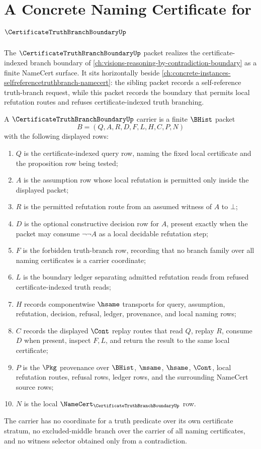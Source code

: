 \chapter{A Concrete Naming Certificate for $\CertificateTruthBranchBoundaryUp$}
\label{ch:concrete-instances-certificatetruthbranchboundary-namecert}

The $\CertificateTruthBranchBoundaryUp$ packet realizes the certificate-indexed branch boundary of \autoref{ch:visions-reasoning-by-contradiction-boundary} as a finite NameCert surface. It sits horizontally beside \autoref{ch:concrete-instances-selfreferencetruthbranch-namecert}: the sibling packet records a self-reference truth-branch request, while this packet records the boundary that permits local refutation routes and refuses certificate-indexed truth branching.

\begin{definition}
\label{def:truth-branch-boundary-carrier}
A $\CertificateTruthBranchBoundaryUp$ carrier is a finite $\BHist$ packet
$$
B=(Q,A,R,D,F,L,H,C,P,N)
$$
with the following displayed rows:
\begin{enumerate}
\item $Q$ is the certificate-indexed query row, naming the fixed local certificate and the proposition row being tested;
\item $A$ is the assumption row whose local refutation is permitted only inside the displayed packet;
\item $R$ is the permitted refutation route from an assumed witness of $A$ to $\bot$;
\item $D$ is the optional constructive decision row for $A$, present exactly when the packet may consume $\neg\neg A$ as a local decidable refutation step;
\item $F$ is the forbidden truth-branch row, recording that no branch family over all naming certificates is a carrier coordinate;
\item $L$ is the boundary ledger separating admitted refutation reads from refused certificate-indexed truth reads;
\item $H$ records componentwise $\hsame$ transports for query, assumption, refutation, decision, refusal, ledger, provenance, and local naming rows;
\item $C$ records the displayed $\Cont$ replay routes that read $Q$, replay $R$, consume $D$ when present, inspect $F,L$, and return the result to the same local certificate;
\item $P$ is the $\Pkg$ provenance over $\BHist$, $\msame$, $\hsame$, $\Cont$, local refutation routes, refusal rows, ledger rows, and the surrounding NameCert source rows;
\item $N$ is the local $\NameCert_{\CertificateTruthBranchBoundaryUp}$ row.
\end{enumerate}
The carrier has no coordinate for a truth predicate over its own certificate stratum, no excluded-middle branch over the carrier of all naming certificates, and no witness selector obtained only from a contradiction.
\end{definition}

